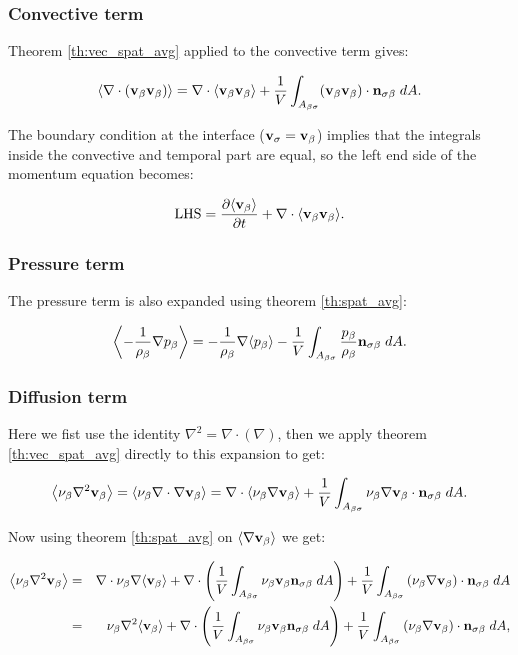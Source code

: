 \subsubsection{Convective term}
Theorem \eqref{th:vec_spat_avg} applied to the convective term gives:

\begin{equation}
{\left< \nabla \cdot (\textbf{v}_{\beta}\textbf{v}_{\beta}) \right>} = \nabla \cdot {\left< \textbf{v}_{\beta}\textbf{v}_{\beta}\right>} + \dfrac{1}{V} \int_{A_{\beta \sigma}}  (\textbf{v}_{\beta} \textbf{v}_{\beta}) \cdot \mathbf{n}_{\sigma \beta} \;dA.
\end{equation}

The boundary condition at the interface ($\textbf{v}_{\sigma} = \textbf{v}_{\beta}$) implies that the integrals inside the convective and temporal part are equal, so the left end side of the momentum equation becomes:

\begin{equation}
\text{LHS} = \dfrac{\partial {\left< \textbf{v}_{\beta}\right>}}{\partial t} + \nabla \cdot {\left< \textbf{v}_{\beta}\textbf{v}_{\beta}\right>}.
\label{eq:lhs}
\end{equation}

\subsubsection{Pressure term}
The pressure term is also expanded using theorem \eqref{th:spat_avg}:

\begin{equation}
{\left< -\dfrac{1}{\rho_{\beta}} \nabla p_{\beta}\right>} = -\dfrac{1}{\rho_{\beta}} \nabla {\left< p_{\beta}\right>} -\dfrac{1}{V} \int_{A_{\beta \sigma}}  \dfrac{p_{\beta}}{\rho_{\beta}} \mathbf{n}_{\sigma \beta} \;dA.
\end{equation}

\subsubsection{Diffusion term}
Here we fist use the identity $\nabla^2 = \nabla \cdot (\nabla)$, then we apply theorem \eqref{th:vec_spat_avg} directly to this expansion to get:

\begin{equation}
{\left< \nu_{\beta}\nabla^2 \textbf{v}_{\beta}\right>} = {\left< \nu_{\beta}\nabla \cdot \nabla \textbf{v}_{\beta} \right>} = \nabla \cdot {\left< \nu_{\beta}\nabla \textbf{v}_{\beta}\right>} +\dfrac{1}{V} \int_{A_{\beta \sigma}}  \nu_{\beta} \nabla \textbf{v}_{\beta} \cdot \mathbf{n}_{\sigma \beta} \;dA.
\label{eq:4_1}
\end{equation}

\noindent Now using theorem \eqref{th:spat_avg} on ${\left< \nabla \textbf{v}_{\beta} \right>}$ we get:

\begin{eqnarray}
	{\left< \nu_{\beta}\nabla^2 \textbf{v}_{\beta}\right>} &=& \nabla \cdot \nu_{\beta} \nabla {\left< \textbf{v}_{\beta}\right>} + \nabla \cdot \left( \dfrac{1}{V} \int_{A_{\beta \sigma}}  \nu_{\beta} \textbf{v}_{\beta}  \mathbf{n}_{\sigma \beta} \;dA \right) + \dfrac{1}{V} \int_{A_{\beta \sigma}} \left( \nu_{\beta} \nabla \textbf{v}_{\beta} \right) \cdot \mathbf{n}_{\sigma \beta} \;dA  \nonumber \\
	&=& \nu_{\beta}\nabla^2 {\left< \textbf{v}_{\beta} \right>} +  \nabla \cdot \left( \dfrac{1}{V} \int_{A_{\beta \sigma}}  \nu_{\beta} \textbf{v}_{\beta} \mathbf{n}_{\sigma \beta} \;dA \right) + \dfrac{1}{V} \int_{A_{\beta \sigma}} \left( \nu_{\beta} \nabla \textbf{v}_{\beta} \right) \cdot \mathbf{n}_{\sigma \beta} \;dA,   \nonumber
\end{eqnarray}

